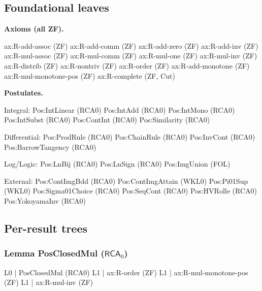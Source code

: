 \documentclass[11pt,reqno]{amsart}
\theoremstyle{redplain}
\begin{document}
\subsection{Foundational leaves}
\noindent%
\begin{minipage}[t]{0.48\linewidth}
	\vspace{0pt}
	\textbf{Axioms (all ZF).}
	\smallskip
	\begin{verbatimbox}
		ax:R-add-assoc      (ZF)
		ax:R-add-comm       (ZF)
		ax:R-add-zero       (ZF)
		ax:R-add-inv        (ZF)
		ax:R-mul-assoc      (ZF)
		ax:R-mul-comm       (ZF)
		ax:R-mul-one        (ZF)
		ax:R-mul-inv        (ZF)
		ax:R-distrib        (ZF)
		ax:R-nontriv        (ZF)
		ax:R-order          (ZF)
		ax:R-add-monotone   (ZF)
		ax:R-mul-monotone-pos (ZF)
		ax:R-complete       (ZF, Cut)
	\end{verbatimbox}
\end{minipage}\hfill
\begin{minipage}[t]{0.48\linewidth}
	\vspace{0pt}
	\textbf{Postulates.}
	\smallskip
	\begin{verbatimbox}
		Integral:
		Pos:IntLinear      (RCA0)
		Pos:IntAdd         (RCA0)
		Pos:IntMono        (RCA0)
		Pos:IntSubst       (RCA0)
		Pos:ContInt        (RCA0)
		Pos:Similarity     (RCA0)

		Differential:
		Pos:ProdRule       (RCA0)
		Pos:ChainRule      (RCA0)
		Pos:InvCont        (RCA0)
		Pos:BarrowTangency (RCA0)

		Log/Logic:
		Pos:LnBij          (RCA0)
		Pos:LnSign         (RCA0)
		Pos:ImgUnion       (FOL)

		External:
		Pos:ContImgBdd     (RCA0)
		Pos:ContImgAttain  (WKL0)
		Pos:Pi01Sup        (WKL0)
		Pos:Sigma01Choice  (RCA0)
		Pos:SeqCont        (RCA0)
		Pos:HVRolle        (RCA0)
		Pos:YokoyamaInv    (RCA0)
	\end{verbatimbox}
\end{minipage}

\medskip

\subsection{Per-result trees }

\subsubsection*{Lemma \textsf{PosClosedMul} ($\textsf{RCA}_0$)}
\begin{verbatimbox}
	L0 | PosClosedMul                     (RCA0)
	L1 |   ax:R-order                     (ZF)
	L1 |   ax:R-mul-monotone-pos          (ZF)
	L1 |   ax:R-mul-inv                   (ZF)
\end{verbatimbox}
\end{document}
